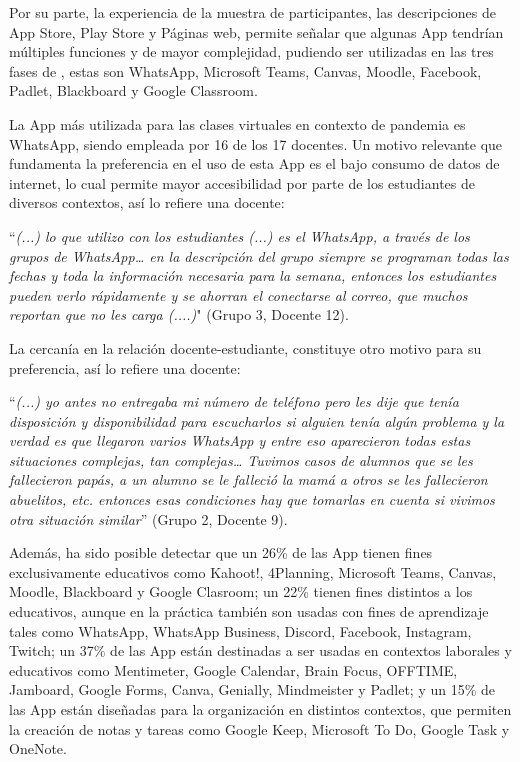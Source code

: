 \documentclass[spanish]{textolivre}
\begin{document}
Por su parte, la experiencia de la muestra de participantes, las descripciones de App Store, Play Store y Páginas web, permite señalar que  algunas App  tendrían múltiples funciones y de mayor complejidad, pudiendo ser utilizadas en las tres fases de \textcite[p. 142]{zimmerman2013}, estas son WhatsApp, Microsoft Teams, Canvas, Moodle, Facebook, Padlet, Blackboard y Google Classroom.

La App más utilizada para las clases virtuales en contexto de pandemia es WhatsApp, siendo empleada por 16 de los 17 docentes. Un motivo relevante que fundamenta la preferencia en el uso de esta App es el bajo consumo de datos de internet, lo cual permite mayor accesibilidad por parte de los  estudiantes de diversos contextos, así lo refiere una docente:

“\emph{(...) lo que utilizo con los estudiantes (...) es el WhatsApp, a través de los grupos de WhatsApp… en la descripción del grupo siempre se programan todas las fechas y toda la información necesaria para la semana, entonces los estudiantes  pueden verlo rápidamente y se ahorran el conectarse al correo, que muchos reportan que no les carga (....)}" (Grupo 3, Docente 12).

La cercanía en la relación docente-estudiante, constituye otro motivo para su preferencia, así lo refiere una docente:

“\emph{(...) yo antes no entregaba mi número de teléfono pero les dije que tenía disposición y disponibilidad para escucharlos si alguien tenía algún problema y la verdad es que llegaron varios WhatsApp y entre eso aparecieron todas estas situaciones complejas, tan complejas… Tuvimos casos de alumnos que se les fallecieron papás, a un alumno se le falleció la mamá a otros se les fallecieron abuelitos, etc. entonces esas condiciones hay que tomarlas en cuenta si vivimos otra situación similar}” (Grupo 2, Docente 9).
 
Además, ha sido posible  detectar que un 26\% de las App tienen fines exclusivamente educativos como Kahoot!, 4Planning, Microsoft Teams, Canvas, Moodle, Blackboard y Google Clasroom; un 22\% tienen fines distintos a los educativos, aunque en la práctica también son usadas con fines de aprendizaje tales como WhatsApp, WhatsApp Business, Discord, Facebook, Instagram, Twitch; un 37\% de las App están destinadas a ser usadas en contextos laborales y educativos como Mentimeter, Google Calendar, Brain Focus, OFFTIME, Jamboard, Google Forms, Canva, Genially, Mindmeister y Padlet; y un 15\% de las App están diseñadas para la organización en distintos contextos, que permiten la creación de notas y tareas como Google Keep, Microsoft To Do, Google Task y OneNote.
\end{document}
